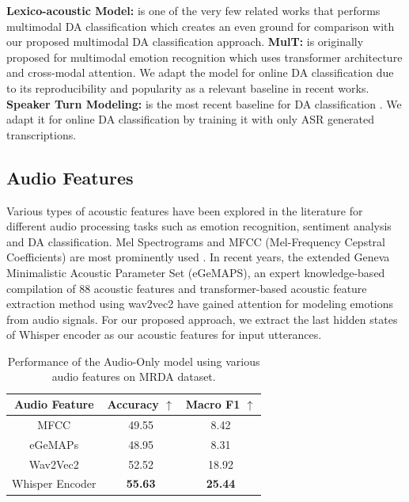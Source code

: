\textbf{Lexico-acoustic Model:} \cite{lexico} is one of the very few related works that performs multimodal DA classification which creates an even ground for comparison with our proposed multimodal DA classification approach. \textbf{MulT:} \cite{tsai-etal-2019-multimodal} is originally proposed  for multimodal emotion recognition which uses transformer architecture and cross-modal attention. We adapt the model for online DA classification due to its reproducibility and popularity as a relevant baseline in recent works. \textbf{Speaker Turn Modeling:} \cite{he-etal-2021-speaker-turn} is the most recent baseline for DA classification . We adapt it for online DA classification by training it with only ASR generated transcriptions.



\subsection{Audio Features}

Various types of acoustic features have been explored in the literature for different audio processing tasks such as emotion recognition, sentiment analysis and DA classification. Mel Spectrograms and MFCC (Mel-Frequency Cepstral Coefficients) are most prominently used \cite{lexico, he2018exploring, saha-etal-2020-towards, REJAIBI2022103107, chudasama2022m2fnet}. In recent years, the extended Geneva Minimalistic Acoustic Parameter Set (eGeMAPS), an expert knowledge-based compilation of 88 acoustic features \cite{ege1, ege2, ege3} and transformer-based acoustic feature extraction method using wav2vec2  \cite{wv1, wv2} have gained attention for modeling emotions from audio signals. For our proposed approach, we extract the last hidden states of Whisper encoder as our acoustic features for input utterances.

\begin{table}[h]
\small
\centering
\begin{tabular}{ccc}
\toprule
Audio Feature & Accuracy $\uparrow$ & Macro F1 $\uparrow$ \\
\midrule
MFCC & 49.55 & 8.42 \\
eGeMAPs & 48.95 & 8.31 \\
Wav2Vec2 & 52.52 & 18.92 \\
Whisper Encoder & \textbf{55.63} & \textbf{25.44} \\
\bottomrule
\end{tabular}
\caption{Performance of the Audio-Only model using various audio features on MRDA dataset.}
\label{tab:audio_feat}
\end{table}

